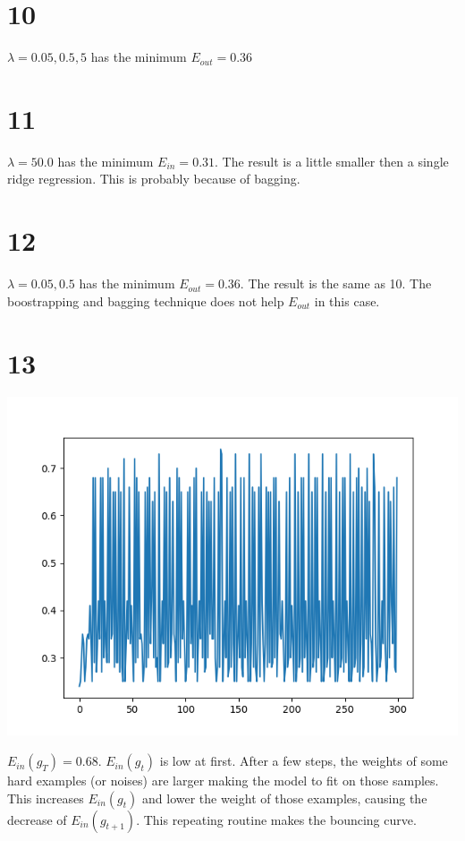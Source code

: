 \documentclass[12pt]{article}
\begin{document}
\section*{10}
$\lambda = 0.05, 0.5, 5$ has the minimum $E_{out} = 0.36$

\section*{11}
$\lambda = 50.0$ has the minimum $E_{in} = 0.31$. 
The result is a little smaller then a single ridge regression.
This is probably because of bagging.

\section*{12}
$\lambda = 0.05, 0.5$ has the minimum $E_{out} = 0.36$.
The result is the same as 10. 
The boostrapping and bagging technique does not help $E_{out}$ in this case.

\section*{13}
\begin{center}
    \includegraphics[scale=0.5]{p13.png}
\end{center}
$E_{in}(g_T) = 0.68$. $E_{in}(g_t)$ is low at first. 
After a few steps, the weights of some hard examples (or noises) are larger making the model to fit on those samples.
This increases $E_{in}(g_t)$ and lower the weight of those examples, causing the decrease of $E_{in}(g_{t+1})$.
This repeating routine makes the bouncing curve.
\end{document}
